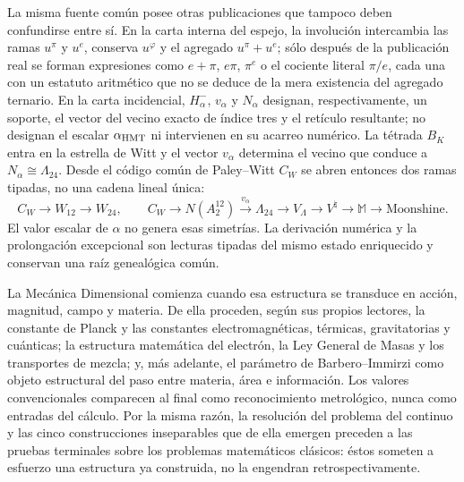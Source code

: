 La misma fuente común posee otras publicaciones que tampoco deben confundirse
entre sí. En la carta interna del espejo, la involución intercambia las ramas
\(u^\pi\) y \(u^e\), conserva \(u^\varphi\) y el agregado
\(u^\pi+u^e\); sólo después de la publicación real se forman expresiones como
\(e+\pi\), \(e\pi\), \(\pi^e\) o el cociente literal \(\pi/e\), cada una con
un estatuto aritmético que no se deduce de la mera existencia del agregado
ternario. En la carta
incidencial, \(H^-_\alpha\), \(v_\alpha\) y \(N_\alpha\) designan,
respectivamente, un soporte, el vector del vecino exacto de índice tres y el
retículo resultante; no designan el escalar \(\alpha_{\rm HMT}\) ni intervienen
en su acarreo numérico. La tétrada \(B_K\) entra en la estrella de Witt y el
vector \(v_\alpha\) determina el vecino que conduce a
\(N_\alpha\cong\Lambda_{24}\). Desde el código común de Paley--Witt \(C_W\)
se abren entonces dos ramas tipadas, no una cadena lineal única:
\[
 C_W\longrightarrow W_{12}\longrightarrow W_{24},
 \qquad
 C_W\longrightarrow N(A_2^{12})\xrightarrow{\,v_\alpha\,}\Lambda_{24}
 \longrightarrow V_\Lambda\longrightarrow V^\natural
 \longrightarrow\mathbb M\longrightarrow\text{Moonshine}.
\]
El valor escalar de \(\alpha\) no genera esas simetrías. La derivación
numérica y la prolongación excepcional son lecturas tipadas del mismo estado
enriquecido y conservan una raíz genealógica común.

La Mecánica Dimensional comienza cuando esa estructura se transduce en
acción, magnitud, campo y materia. De ella proceden, según sus propios
lectores, la constante de Planck y las constantes electromagnéticas,
térmicas, gravitatorias y cuánticas; la estructura matemática del electrón,
la Ley General de Masas y los transportes de mezcla; y, más adelante, el
parámetro de Barbero--Immirzi como objeto estructural del paso entre materia,
área e información. Los valores convencionales comparecen al final como
reconocimiento metrológico, nunca como entradas del cálculo. Por la misma
razón, la resolución del problema del continuo y las cinco construcciones
inseparables que de ella emergen preceden a las pruebas terminales sobre los
problemas matemáticos clásicos: éstos someten a esfuerzo una estructura ya
construida, no la engendran retrospectivamente.

